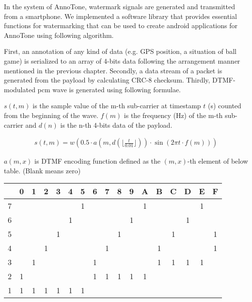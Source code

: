 In the system of AnnoTone, watermark signals are generated and transmitted from a smartphone.
We implemented a software library that provides essential functions for watermarking that can be used to create android applications for AnnoTone using following algorithm.

First, an annotation of any kind of data (e.g. GPS position, a situation of ball game) is serialized to an array of 4-bits data following the arrangement manner mentioned in the previous chapter.
Secondly, a data stream of a packet is generated from the payload by calculating CRC-8 checksum.
Thirdly, DTMF-modulated pcm wave is generated using following formulae.

$s(t, m)$ is the sample value of the m-th sub-carrier at timestamp $t$ (s) counted from the beginning of the wave. $f(m)$ is the frequency (Hz) of the m-th sub-carrier and $d(n)$ is the n-th 4-bits data of the payload.

\begin{align}
s(t, m) = w( 0.5 \cdot a(m, d(\lfloor \frac{t}{0.01} \rfloor)) \cdot \sin{(2 \pi t \cdot f(m))} )
\end{align}

$a(m, x)$ is DTMF encoding function defined as the $(m, x)$-th element of below table.
(Blank means zero)

\begin{table}[ht]
\begin{center}
	\begin{tabular}{|c||c|c|c|c|c|c|c|c|c|c|c|c|c|c|c|c|} \hline
		  & 0 & 1 & 2 & 3 & 4 & 5 & 6 & 7 & 8 & 9 & A & B & C & D & E & F \\ \hline \hline
		7 &   &   &   &   &   & 1 &   &   &   &   & 1 &   &   &   & 1 &   \\ \hline
		6 &   &   &   &   & 1 &   &   &   &   & 1 &   &   &   & 1 &   &   \\ \hline
		5 &   &   &   & 1 &   &   &   &   & 1 &   &   &   & 1 &   &   & 1 \\ \hline
		4 &   &   & 1 &   &   &   &   & 1 &   &   &   & 1 &   &   &   & 1 \\ \hline
		3 &   & 1 &   &   &   &   & 1 &   &   &   &   & 1 & 1 & 1 & 1 &   \\ \hline
		2 & 1 &   &   &   &   &   & 1 & 1 & 1 & 1 & 1 &   &   &   &   &   \\ \hline
		1 & 1 & 1 & 1 & 1 & 1 & 1 &   &   &   &   &   &   &   &   &   &   \\ \hline
	\end{tabular}
\end{center}
\end{table}

